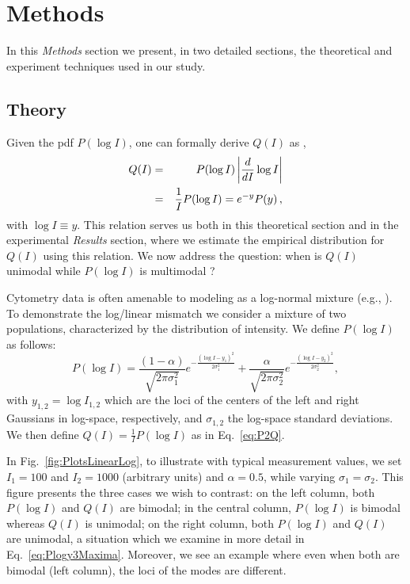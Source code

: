 \documentclass[11pt,a4paper,draft]{article}
\begin{document}
\newpage

\section*{Methods}
In this \emph{Methods} section we present, in two detailed sections, the theoretical and experiment techniques used in our study. 

\subsection*{Theory}

\smallskip
Given the pdf $P(\log I)$, one can formally derive $Q(I)$ as \cite{Mukhopadhyay2000},
\begin{eqnarray} 
\label{eq:P2Q}
Q(I) &=& P(\log I) \left\vert \frac{d}{dI} \log I \right\vert \\ \nonumber
 &=& \frac{1}{I}P(\log I) = e^{-y} P(y)\,,
\end{eqnarray}
with $\log I\equiv y$. This relation serves us both in this theoretical section and in the experimental \emph{Results} section, where we estimate the empirical distribution for $Q(I)$ using this relation. We now address the question: when is $Q(I)$ unimodal while $P({\log I})$ is multimodal ?

\smallskip
Cytometry data is often amenable to modeling as a log-normal mixture (e.g., \cite{Vogel2016}). To demonstrate the log/linear mismatch we consider a mixture of two populations, characterized by the distribution of intensity. We define $P(\log I)$ as follows:
\begin{equation}
P(\log I) = \frac{(1-\alpha)}{\sqrt{2\pi\sigma_1^2}}e^{-\frac{(\log I - y_1)^2}{2\sigma_1^2}} + \frac{\alpha}{\sqrt{2\pi\sigma_2^2}}e^{-\frac{(\log I - y_2)^2}{2\sigma_2^2}},
\label{eq:LogNormalMix}
\end{equation}
with $y_{1,2}=\log I_{1,2}$ which are the loci of the centers of the left and right Gaussians in log-space, respectively, and $\sigma_{1,2}$ the log-space standard deviations. We then define $Q(I)=\frac{1}{I}P(\log I)$ as in Eq.~\ref{eq:P2Q}. 
\smallskip

In Fig.~\ref{fig:PlotsLinearLog}, to illustrate with typical measurement values, we set $I_1=100$ and $I_2=1000$ (arbitrary units) and $\alpha=0.5$, while varying $\sigma_1=\sigma_2$. This figure presents the three cases we wish to contrast: on the left column, both $P(\log I)$ and $Q(I)$ are bimodal; in the central column, $P(\log I)$ is bimodal whereas $Q(I)$ is unimodal; on the right column, both $P(\log I)$ and $Q(I)$ are unimodal, a situation which we examine in more detail in Eq.~\ref{eq:Plogy3Maxima}. Moreover, we see an example where even when both are bimodal (left column), the loci of the modes are different. 
\smallskip
\end{document}
